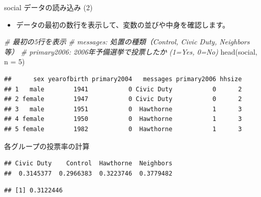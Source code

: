 \documentclass[
  ignorenonframetext,
]{beamer}
\newenvironment{Shaded}{\begin{snugshade}}{\end{snugshade}}
\newcommand{\AttributeTok}[1]{\textcolor[rgb]{0.77,0.63,0.00}{#1}}
\newcommand{\CommentTok}[1]{\textcolor[rgb]{0.56,0.35,0.01}{\textit{#1}}}
\newcommand{\DecValTok}[1]{\textcolor[rgb]{0.00,0.00,0.81}{#1}}
\newcommand{\FunctionTok}[1]{\textcolor[rgb]{0.00,0.00,0.00}{#1}}
\newcommand{\NormalTok}[1]{#1}
\newcommand{\SpecialCharTok}[1]{\textcolor[rgb]{0.00,0.00,0.00}{#1}}
\providecommand{\tightlist}{%
  \setlength{\itemsep}{0pt}\setlength{\parskip}{0pt}}
\begin{document}
\begin{frame}[fragile]{social データの読み込み (2)}
\protect\hypertarget{social-ux30c7ux30fcux30bfux306eux8aadux307fux8fbcux307f-2}{}
\begin{itemize}
\tightlist
\item
  データの最初の数行を表示して、変数の並びや中身を確認します。
\end{itemize}

\scriptsize

\begin{Shaded}
\begin{Highlighting}[]
\CommentTok{\# 最初の5行を表示}
\CommentTok{\# messages: 処置の種類（Control, Civic Duty, Neighbors 等）}
\CommentTok{\# primary2006: 2006年予備選挙で投票したか (1=Yes, 0=No)}
\FunctionTok{head}\NormalTok{(social, }\AttributeTok{n =} \DecValTok{5}\NormalTok{)}
\end{Highlighting}
\end{Shaded}

\begin{verbatim}
##      sex yearofbirth primary2004   messages primary2006 hhsize
## 1   male        1941           0 Civic Duty           0      2
## 2 female        1947           0 Civic Duty           0      2
## 3   male        1951           0  Hawthorne           1      3
## 4 female        1950           0  Hawthorne           1      3
## 5 female        1982           0  Hawthorne           1      3
\end{verbatim}

\normalsize
\end{frame}

\begin{frame}[fragile]{各グループの投票率の計算}
\protect\hypertarget{ux5404ux30b0ux30ebux30fcux30d7ux306eux6295ux7968ux7387ux306eux8a08ux7b97}{}
\scriptsize

\begin{Shaded}
\end{Shaded}

\begin{verbatim}
## Civic Duty    Control  Hawthorne  Neighbors 
##  0.3145377  0.2966383  0.3223746  0.3779482
\end{verbatim}

\begin{Shaded}
\end{Shaded}

\begin{verbatim}
## [1] 0.3122446
\end{verbatim}

\normalsize
\end{frame}
\end{document}
